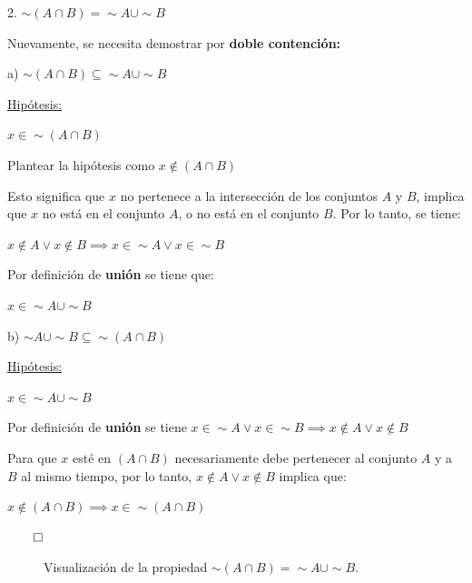 \documentclass{article}
\begin{document}
2. $\sim(A \cap B) = \sim A \cup \sim B$

Nuevamente, se necesita demostrar por \textbf{doble contención:}

a) $\sim (A \cap B) \subseteq \sim A \cup \sim B$

\underline{Hipótesis:}

$x \in \sim (A \cap B)$

Plantear la hipótesis como $x \not \in (A \cap B)$

Esto significa que $x$ no pertenece a la intersección de los conjuntos $A$ y $B$, implica que $x$ no está en el conjunto $A$, o no está en el conjunto $B$. Por lo tanto, se tiene:

$x \not \in A \lor x \not \in B \implies x \in \sim A \lor x \in \sim B$

Por definición de \textbf{unión} se tiene que:

$x \in \sim A \cup \sim B$

b) $\sim A \cup \sim B \subseteq \sim(A \cap B)$

\underline{Hipótesis:}

$x \in \sim A \cup \sim B$

Por definición de \textbf{unión} se tiene $x \in \sim A \lor x \in \sim B \implies x \not \in A \lor x \not \in B$

Para que $x$ esté en $(A \cap B)$ necesariamente debe pertenecer al conjunto $A$ y a $B$ al mismo tiempo, por lo tanto, $x \not \in A \lor x \not \in B$ implica que: 

$x \not \in (A \cap B) \implies x \in \sim (A \cap B)$

$\qed$

\begin{figure}[H]
    \centering
    \caption{Visualización de la propiedad $\sim(A \cap B) = \sim A \cup \sim B$.}
\end{figure}
\end{document}
